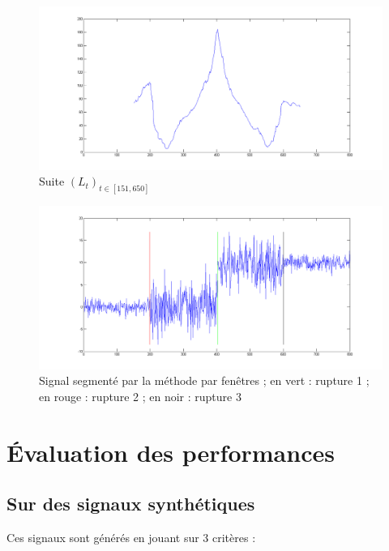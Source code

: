 \documentclass[french,11pt,notitlepage]{report}
\begin{document}
	\begin{figure}[hp]
		\includegraphics[height=0.25\textheight,width=\textwidth]{multi_rupt_llr_ex.png}
		\caption{Suite $(L_t)_{t\in[151,650]}$}
		\label{multi_rupt_llr_ex}
	\end{figure}
	
	\begin{figure}[hp]
		\includegraphics[height=0.25\textheight,width=\textwidth]{test_multi_rupt_seg.png}
		\caption{Signal segmenté par la méthode par fenêtres ; en vert : rupture 1 ; en rouge : rupture 2 ; en noir : rupture 3}
		\label{test_multi_rupt_seg}
	\end{figure}
	
	\chapter{Évaluation des performances}
	
	
	
	\section{Sur des signaux synthétiques}
	
	Ces signaux sont générés en jouant sur 3 critères :
	
\end{document}
